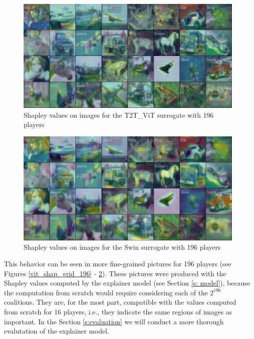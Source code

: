 \documentclass[magisterska,en]{pracamgr}
\begin{document}
\begin{figure}[H]
\centering
\includegraphics[scale=0.4]{./images/t2t_vit_shap_grid_196.png}
\caption{Shapley values on images for the T2T\_ViT surrogate with 196 players}
\label{t2t_vit_shap_grid_196}
\end{figure}


\begin{figure}[H]
\centering
\includegraphics[scale=0.4]{./images/swin_shap_grid_196.png}
\caption{Shapley values on images for the Swin surrogate with 196 players}
\label{swin_shap_grid_196}
\end{figure}

\pagebreak


This behavior can be seen in more fine-grained pictures for 196 players (see Figures \ref{vit_shap_grid_196} - \ref{swin_shap_grid_196}). These pictures were produced with the Shapley values computed by the explainer model (see Section \ref{s: model}), because the computation from scratch would require considering each of the $2^{196}$ coalitions. They are, for the most part, compatible with the values computed from scratch for 16 players, i.e., they indicate the same regions of images as important. In the Section \ref{s:evaluation} we will conduct a more thorough evalutation of the explainer model.
\end{document}
